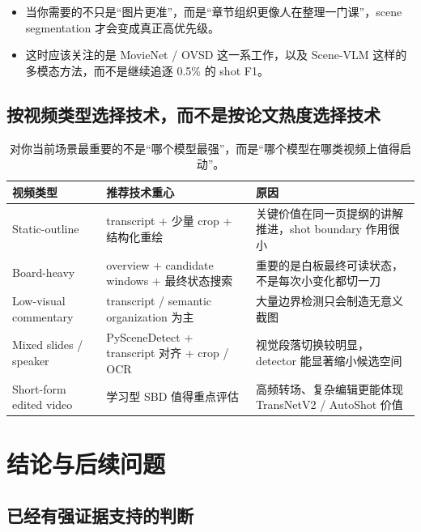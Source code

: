 \documentclass[a4paper]{article}
\begin{document}
\begin{itemize}
\item 当你需要的不只是“图片更准”，而是“章节组织更像人在整理一门课”，scene segmentation 才会变成真正高优先级。
\item 这时应该关注的是 MovieNet / OVSD 这一系工作，以及 Scene-VLM 这样的多模态方法，而不是继续追逐 0.5\% 的 shot F1。
\end{itemize}

\subsection{按视频类型选择技术，而不是按论文热度选择技术}

\begin{table}[H]
\centering
\small
\begin{tabularx}{\textwidth}{p{2.8cm}p{3.0cm}Y}
\toprule
视频类型 & 推荐技术重心 & 原因 \\
\midrule
Static-outline & transcript + 少量 crop + 结构化重绘 & 关键价值在同一页提纲的讲解推进，shot boundary 作用很小 \\
Board-heavy & overview + candidate windows + 最终状态搜索 & 重要的是白板最终可读状态，不是每次小变化都切一刀 \\
Low-visual commentary & transcript / semantic organization 为主 & 大量边界检测只会制造无意义截图 \\
Mixed slides / speaker & PySceneDetect + transcript 对齐 + crop / OCR & 视觉段落切换较明显，detector 能显著缩小候选空间 \\
Short-form edited video & 学习型 SBD 值得重点评估 & 高频转场、复杂编辑更能体现 TransNetV2 / AutoShot 价值 \\
\bottomrule
\end{tabularx}
\caption{对你当前场景最重要的不是“哪个模型最强”，而是“哪个模型在哪类视频上值得启动”。}
\end{table}

\section{结论与后续问题}

\subsection{已经有强证据支持的判断}
\end{document}
